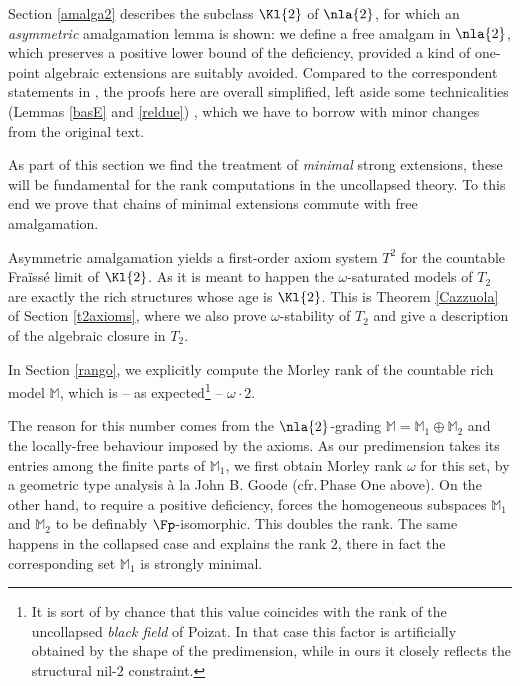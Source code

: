 \medskip
Section \ref{amalga2} describes the subclass $\Kl{2}$ of $\nla{2}$, for which
an {\em asymmetric} amalgamation lemma is shown: we define a free amalgam in $\nla{2}$, which preserves a positive lower bound
of the deficiency, provided a kind of one-point algebraic extensions are suitably avoided.
Compared to the correspondent statements in \cite{bad}, the proofs here are overall simplified, left aside some
technicalities (Lemmas \ref{basE} and \ref{reldue})%
, which we have to borrow with minor changes from the original text.

As part of this section we find the treatment of {\em minimal} strong extensions, these will be
fundamental for the rank computations in the uncollapsed theory. To this end we prove that chains of minimal extensions
commute with free amalgamation.

\medskip
Asymmetric amalgamation yields a first-order axiom system $T^{2}$
for the countable Fra\"iss\'e limit of $\Kl{2}$. As it is meant to happen the $\omega$-saturated models
of $T_{2}$ are exactly the rich structures whose age is $\Kl{2}$. This is Theorem \ref{Cazzuola} of Section \ref{t2axioms},
where we also prove $\omega$-stability of $T_{2}$ and give a description of the algebraic closure in $T_{2}$.

In Section \ref{rango}, we explicitly compute the Morley rank of the %
countable rich model $\mathbb{M}$, which is -- as expected\footnote{It is sort of
by chance that this value coincides with the rank of the uncollapsed {\em black field} of Poizat. In that case this factor
is artificially obtained by the shape of the predimension, while in ours it closely reflects the structural nil-$2$ constraint.}
 -- $\omega\cdot2$.
 
The reason for this number comes from the $\nla{2}$-grading $\mathbb{M}=\mathbb{M}_{1}\oplus\mathbb{M}_{2}$ and the
locally-free behaviour imposed by the axioms.
As our predimension takes its entries among the finite parts of $\mathbb{M}_{1}$, we first obtain Morley rank $\omega$ for this
set, by a geometric type analysis \`a la John B. Goode (cfr.\,Phase One above).
On the other hand, to require a positive deficiency, forces the
homogeneous subspaces $\mathbb{M}_{1}$ and $\mathbb{M}_{2}$ to be definably $\Fp$-isomorphic. This doubles the rank.
The same happens in the collapsed case and explains the rank $2$, there in fact the corresponding set
$\mathbb{M}_{1}$ is strongly minimal.

